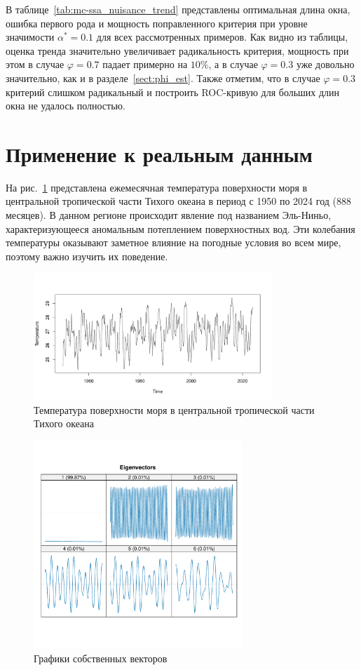 \documentclass[specialist,
substylefile = spbu.rtx,
               subf,href,colorlinks=true,12pt]{disser}
\theoremstyle{definition}
\begin{document}
В таблице~\ref{tab:mc-ssa_nuisance_trend} представлены оптимальная длина окна, ошибка первого рода и мощность поправленного критерия при уровне значимости $\alpha^*=0.1$ для всех рассмотренных примеров. Как видно из таблицы, оценка тренда значительно увеличивает радикальность критерия, мощность при этом в случае $\varphi=0.7$ падает примерно на $10\%$, а в случае $\varphi=0.3$ уже довольно значительно, как и в разделе~\ref{sect:phi_est}. Также отметим, что в случае $\varphi=0.3$ критерий слишком радикальный и построить ROC-кривую для больших длин окна не удалось полностью.

\section{Применение к реальным данным}\label{sect:examples}
На рис.~\ref{Nino_ts} представлена ежемесячная температура поверхности моря в центральной тропической части Тихого океана в период с 1950 по 2024 год ($888$ месяцев). В данном регионе происходит явление под названием Эль-Ниньо, характеризующееся аномальным потеплением поверхностных вод. Эти колебания температуры оказывают заметное влияние на погодные условия во всем мире, поэтому важно изучить их поведение.
\begin{figure}[h!]
	\centering
	\includegraphics[width=0.8\textwidth]{img/Nino_ts.pdf}
	\caption{Температура поверхности моря в центральной тропической части Тихого океана}
	\label{Nino_ts}	
\end{figure}
\begin{figure}[h!]
	\centering
	\includegraphics[width=0.7\textwidth]{img/Nino_ssa_vectors.pdf}
	\caption{Графики собственных векторов}
	\label{Nino_ssa_vectors}	
\end{figure}
\end{document}
